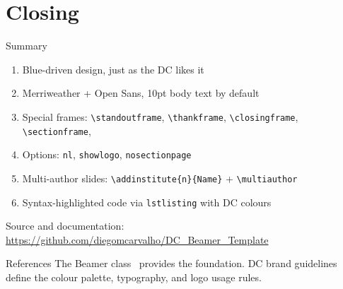 \documentclass[aspectratio=169,10pt]{beamer}
\begin{document}


\begin{frame}[plain]
\end{frame}


\section{Closing}

\begin{frame}{Summary}
  \begin{enumerate}
    \item Blue-driven design, just as the DC likes it
    \item Merriweather + Open Sans, 10pt body text by default
    \item Special frames: \texttt{\textbackslash standoutframe}, \texttt{\textbackslash thankframe}, \texttt{\textbackslash closingframe}, \texttt{\textbackslash sectionframe},
    \item Options: \texttt{nl}, \texttt{showlogo}, \texttt{nosectionpage}
    \item Multi-author slides: \texttt{\textbackslash addinstitute\{n\}\{Name\}} + \texttt{\textbackslash multiauthor}
    \item Syntax-highlighted code via \texttt{lstlisting} with DC colours
  \end{enumerate}

  \vskip 12pt
  {\small Source and documentation: \url{https://github.com/diegomcarvalho/DC_Beamer_Template}}
\end{frame}


\closingframe

\closingframe[%
  \color{DCwhite!30}%
  \rule{2.6cm}{1.2cm}\hspace{0.8cm}%
  \rule{2.6cm}{1.2cm}\hspace{0.8cm}%
  \rule{2.6cm}{1.2cm}%
]

\begin{frame}[allowframebreaks]{References}
  The Beamer class~\cite{tantau2004} provides the foundation.
  DC brand guidelines~\cite{uubrand2025} define the colour palette,
  typography, and logo usage rules.

  \vskip 6pt
  \printbibliography
\end{frame}
\end{document}
